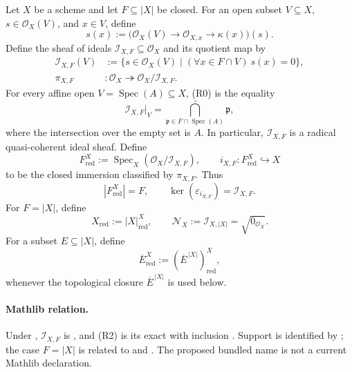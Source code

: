\begin{definition}
  \label{def:nagata-reduced-closed-subscheme}
  \lean{}

  Let $X$ be a scheme and let $F\subseteq |X|$ be closed.  For an open
  subset $V\subseteq X$, $s\in\mathcal O_X(V)$, and $x\in V$, define
  \[
    s(x):=\bigl(\mathcal O_X(V)\longrightarrow
      \mathcal O_{X,x}\longrightarrow\kappa(x)\bigr)(s).
  \]
  Define the sheaf of ideals $\mathcal I_{X,F}\subseteq\mathcal O_X$ and
  its quotient map by
  \[
  \begin{aligned}
    \mathcal I_{X,F}(V)
      &:=\{s\in\mathcal O_X(V)\mid
          (\forall x\in F\cap V)\ s(x)=0\},\\
    \pi_{X,F}&\colon\mathcal O_X\twoheadrightarrow
      \mathcal O_X/\mathcal I_{X,F}.
  \end{aligned}                                                     \tag{R0}
  \]
  For every affine open $V=\operatorname{Spec}(A)\subseteq X$, (R0) is
  the equality
  \[
    \mathcal I_{X,F}|_V
      =\widetilde{\bigcap_{\mathfrak p\in F\cap\operatorname{Spec}(A)}
          \mathfrak p},                                           \tag{R1}
  \]
  where the intersection over the empty set is $A$.  In particular,
  $\mathcal I_{X,F}$ is a radical quasi-coherent ideal sheaf.  Define
  \[
    F_{\mathrm{red}}^X
      :=\operatorname{Spec}_X(\mathcal O_X/\mathcal I_{X,F}),
    \qquad
    i_{X,F}\colon F_{\mathrm{red}}^X\hookrightarrow X              \tag{R2}
  \]
  to be the closed immersion classified by $\pi_{X,F}$.  Thus
  \[
    |F_{\mathrm{red}}^X|=F,
    \qquad
    \ker(\varepsilon_{i_{X,F}})=\mathcal I_{X,F}.
  \]
  For $F=|X|$, define
  \[
    X_{\mathrm{red}}:=|X|_{\mathrm{red}}^X,
    \qquad
    \mathcal N_X:=\mathcal I_{X,|X|}=\sqrt{0_{\mathcal O_X}}.
  \]
  For a subset $E\subseteq|X|$, define
  \[
    \overline E_{\mathrm{red}}^X
      :=(\overline E^{\,|X|})_{\mathrm{red}}^X,
  \]
  whenever the topological closure $\overline E^{\,|X|}$ is used below.

  \paragraph{Mathlib relation.}
  Under ,
  $\mathcal I_{X,F}$ is
  \texttt{}, and (R2) is
  its exact \texttt{} with inclusion
  \texttt{}.  Support is identified by
  \texttt{}; the case
  $F=|X|$ is related to \texttt{} and
  \texttt{}.  The proposed
  bundled name \texttt{}
  is not a current Mathlib declaration.
\end{definition}

